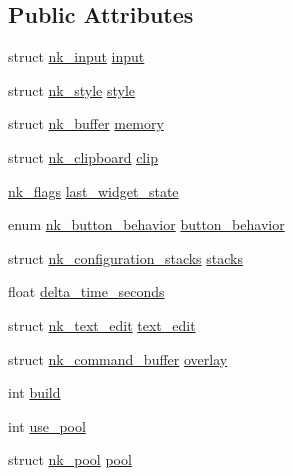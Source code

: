 \subsection*{Public Attributes}
\begin{DoxyCompactItemize}
\item 
struct \mbox{\hyperlink{structnk__input}{nk\+\_\+input}} \mbox{\hyperlink{structnk__context_abee1c200e8e185fe718556c0ddff31ad}{input}}
\item 
struct \mbox{\hyperlink{structnk__style}{nk\+\_\+style}} \mbox{\hyperlink{structnk__context_a39208175c061b8486ee8fb51e50a243e}{style}}
\item 
struct \mbox{\hyperlink{structnk__buffer}{nk\+\_\+buffer}} \mbox{\hyperlink{structnk__context_a678e6980553a5f32f7b59f2fbcebebe9}{memory}}
\item 
struct \mbox{\hyperlink{structnk__clipboard}{nk\+\_\+clipboard}} \mbox{\hyperlink{structnk__context_a834f5a5fad2919a354472381b013a81f}{clip}}
\item 
\mbox{\hyperlink{nuklear_8h_a19e0e2f6db4862891d9801de3c3da323}{nk\+\_\+flags}} \mbox{\hyperlink{structnk__context_a15a7e828c4fb1ac317c72f00ff278b95}{last\+\_\+widget\+\_\+state}}
\item 
enum \mbox{\hyperlink{nuklear_8h_aa9c50dd424dfcd57bab32dea3505ea26}{nk\+\_\+button\+\_\+behavior}} \mbox{\hyperlink{structnk__context_a1b37f5fdd034ad23c79f90a0094ac349}{button\+\_\+behavior}}
\item 
struct \mbox{\hyperlink{structnk__configuration__stacks}{nk\+\_\+configuration\+\_\+stacks}} \mbox{\hyperlink{structnk__context_a86bc92d9133c81f3dd85c8ae99d612dc}{stacks}}
\item 
float \mbox{\hyperlink{structnk__context_a400eeefb70eab5d544831b856300ac06}{delta\+\_\+time\+\_\+seconds}}
\item 
struct \mbox{\hyperlink{structnk__text__edit}{nk\+\_\+text\+\_\+edit}} \mbox{\hyperlink{structnk__context_aca8a2124af97661372f7b35d636c9bc6}{text\+\_\+edit}}
\item 
struct \mbox{\hyperlink{structnk__command__buffer}{nk\+\_\+command\+\_\+buffer}} \mbox{\hyperlink{structnk__context_ae51cac633c54b94a63c8fe77b9558f4a}{overlay}}
\item 
int \mbox{\hyperlink{structnk__context_a0d0f953ef2b6c56b046e4e5488d074e6}{build}}
\item 
int \mbox{\hyperlink{structnk__context_a10afb1419df73de41b2be1d0bff8523c}{use\+\_\+pool}}
\item 
struct \mbox{\hyperlink{structnk__pool}{nk\+\_\+pool}} \mbox{\hyperlink{structnk__context_a84dcedd9a6418f47d22f39e2b20d741d}{pool}}

\end{DoxyCompactItemize}
